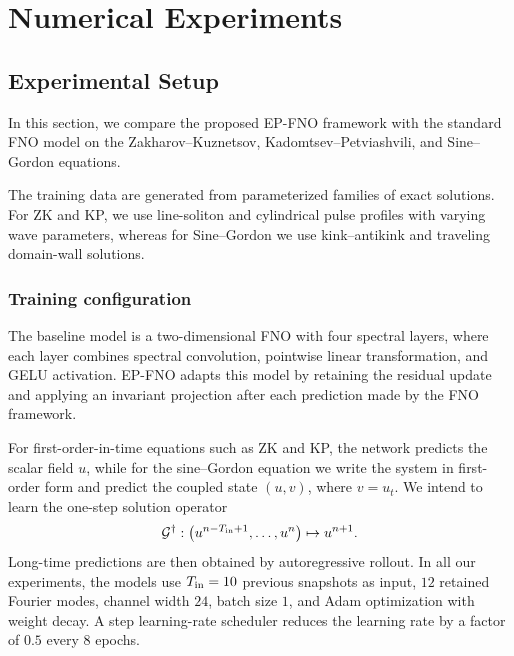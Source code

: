 \documentclass[11pt,a4paper]{article}
\theoremstyle{definition}
\theoremstyle{remark}
\numberwithin{equation}{section}
\numberwithin{figure}{section}
\numberwithin{table}{section}
\begin{document}
\section{Numerical Experiments}
\label{sec:numerical_experiments}

\subsection{Experimental Setup}
\label{subsec:experimental_setup}

In this section, we compare the proposed EP-FNO framework with the standard FNO model on the
Zakharov--Kuznetsov, Kadomtsev--Petviashvili, and Sine--Gordon equations.

The training data are generated from parameterized families of exact solutions. For ZK and KP, we use line-soliton and cylindrical pulse profiles with varying wave parameters, whereas for Sine--Gordon we use kink--antikink and traveling domain-wall solutions.

\subsubsection{Training configuration}\label{trainconfig}

The baseline model is a two-dimensional FNO with four spectral layers, where each layer combines spectral convolution, pointwise linear transformation, and GELU activation. EP-FNO adapts this model by retaining the residual update and applying an invariant projection after each prediction made by the FNO framework.

For first-order-in-time equations such as ZK and KP, the
network predicts the scalar field $u$, while for the sine--Gordon equation we write the system in first-order form and predict the coupled state $(u,v)$,
where $v=u_t$. We intend to learn the one-step solution operator 
\begin{align}
    \mathcal G^{\dagger}:
\bigl(u^{n-T_{\rm in}+1},\ldots,u^n\bigr)
\mapsto u^{n+1}.
\end{align}
Long-time predictions are then obtained by autoregressive rollout. In all our experiments, the models use $T_{\rm in}=10$ previous snapshots as input, $12$ retained Fourier modes,
channel width $24$, batch size $1$, and Adam optimization with weight decay.
A step learning-rate scheduler reduces the learning rate by a factor of $0.5$
every $8$ epochs.
\end{document}
